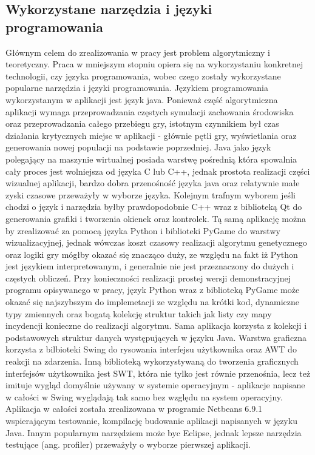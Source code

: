 \subsection{Wykorzystane narzędzia i języki programowania}
\begin{par}
	Głównym celem do zrealizowania w pracy jest problem algorytmiczny i teoretyczny.
Praca w mniejszym stopniu opiera się na wykorzystaniu konkretnej technologii, czy języka programowania, wobec czego zostały wykorzystane popularne narzędzia i języki programowania.
Językiem programowania wykorzystanym w aplikacji jest język java.
Ponieważ część algorytmiczna aplikacji wymaga przeprowadzania częstych symulacji zachowania środowiska oraz przeprowadzania całego przebiegu gry, istotnym czynnikiem był czas działania krytycznych miejsc w aplikacji - głównie pętli gry, wyświetlania oraz generowania nowej populacji na podstawie poprzedniej.
Java jako język polegający na maszynie wirtualnej posiada warstwę pośrednią która spowalnia cały proces jest wolniejsza od języka C lub C++,
jednak prostota realizacji części wizualnej aplikacji, bardzo dobra przenośność języka java oraz relatywnie małe zyski czasowe przeważyły w wyborze języka.
Kolejnym trafnym wyborem jeśli chodzi o język i narzędzia byłby prawdopodobnie C++ wraz z biblioteką Qt do generowania grafiki i tworzenia okienek oraz kontrolek.
Tą samą aplikację można by zrealizować za pomocą języka Python i biblioteki PyGame do warstwy wizualizacyjnej,
jednak wówczas koszt czasowy realizacji algorytmu genetycznego oraz logiki gry mógłby okazać się znacząco duży, ze względu na fakt iż Python jest językiem interpretowanym, i generalnie nie jest przeznaczony do dużych i częstych obliczeń.
Przy konieczności realizacji prostej wersji demonstracyjnej programu opisywanego w pracy, język Python wraz z biblioteką PyGame może okazać się najszybszym do implemetacji ze względu na krótki kod, dynamiczne typy zmiennych oraz bogatą kolekcję struktur takich jak listy czy mapy incydencji konieczne do realizacji algorytmu.
Sama aplikacja korzysta z kolekcji i podstawowych struktur danych występujących w języku Java.
Warstwa graficzna korzysta z bilbioteki Swing do rysowania interfejsu użytkownika oraz AWT do reakcji na zdarzenia.
Inną biblioteką wykorzystywaną do tworzenia graficznych interfejsów użytkownika jest SWT, która nie tylko jest równie przenośnia, lecz też imituje wygląd domyślnie używany w systemie operacyjnym - aplikacje napisane w całości w Swing wyglądają tak samo bez względu na system operacyjny.
Aplikacja w całości została zrealizowana w programie Netbeans 6.9.1 wspierającym testowanie, kompilację budowanie aplikacji napisanych w języku Java.
Innym popularnym narzędziem może byc Eclipse, jednak lepsze narzędzia testujące (ang. profiler) przeważyły o wyborze pierwszej aplikacji.
\end{par}
